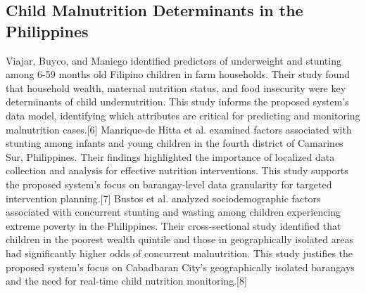 \documentclass[12pt, a4paper]{report}
\begin{document}
\subsection{Child Malnutrition Determinants in the Philippines}
Viajar, Buyco, and Maniego identified predictors of underweight and stunting among 6-59 months old Filipino children in farm households. Their study found that household wealth, maternal nutrition status, and food insecurity were key determinants of child undernutrition. This study informs the proposed system's data model, identifying which attributes are critical for predicting and monitoring malnutrition cases.[6] 
Manrique-de Hitta et al. examined factors associated with stunting among infants and young children in the fourth district of Camarines Sur, Philippines. Their findings highlighted the importance of localized data collection and analysis for effective nutrition interventions. This study supports the proposed system's focus on barangay-level data granularity for targeted intervention planning.[7] 
Bustos et al. analyzed sociodemographic factors associated with concurrent stunting and wasting among children experiencing extreme poverty in the Philippines. Their cross-sectional study identified that children in the poorest wealth quintile and those in geographically isolated areas had significantly higher odds of concurrent malnutrition. This study justifies the proposed system's focus on Cabadbaran City's geographically isolated barangays and the need for real-time child nutrition monitoring.[8] 
\end{document}
